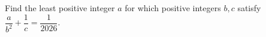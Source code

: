 Find the least positive integer $a$ for which positive integers $b,c$ satisfy $\dfrac{a}{b^2} + \dfrac{1}{c} = \dfrac{1}{2026}$.
